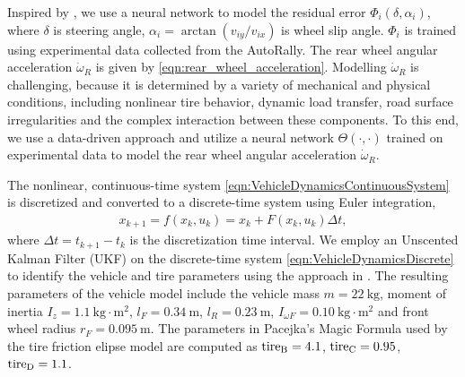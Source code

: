 Inspired by \cite{acosta2018tire}, we use a neural network to model the residual error $\Phi_i(\delta, \alpha_i)$, where $\delta$ is steering angle, $\alpha_i = \arctan(v_{iy}/v_{ix})$ is wheel slip angle. $\Phi_i$ is trained using experimental data collected from the AutoRally. The rear wheel angular acceleration $\dot{\omega}_R$ is given by \eqref{eqn:rear_wheel_acceleration}. Modelling $\dot{\omega}_R$ is challenging, because it is determined by a variety of mechanical and physical conditions, including nonlinear tire behavior, dynamic load transfer, road surface irregularities and the complex interaction between these components. To this end, we use a data-driven approach and utilize a neural network $\Theta(\cdot, \cdot)$ trained on experimental data to model the rear wheel angular acceleration $\dot{\omega}_R$.

The nonlinear, continuous-time system \eqref{eqn:VehicleDynamicsContinuousSystem} is discretized and converted to a discrete-time system using Euler integration,
\begin{align}\label{eqn:VehicleDynamicsDiscrete}
    x_{k+1} = f(x_k, u_k) = x_k + F(x_k, u_k)\Delta t,
\end{align}
where $\Delta t = t_{k+1} - t_k$ is the discretization time interval.
We employ an Unscented Kalman Filter (UKF) on the discrete-time system \eqref{eqn:VehicleDynamicsDiscrete} to identify the vehicle and tire parameters using the approach in \cite{changxi}. The resulting parameters of the vehicle model include the vehicle mass $m = 22~\mathrm{kg}$, moment of inertia $I_z = 1.1 ~\mathrm{kg\cdot m^2}$, $l_F = 0.34~\mathrm{m}$, $l_R = 0.23~\mathrm{m}$, $I_{\omega F} = 0.10 ~\mathrm{kg\cdot m^2}$ and front wheel radius $r_F = 0.095~\mathrm{m}$. The parameters in Pacejka's Magic Formula used by the tire friction elipse model \cite{velenis2010steady} are computed as $\mathrm{tire}_{\mathrm{B}} = 4.1$, $\mathrm{tire}_{\mathrm{C}}=0.95$, $\mathrm{tire}_{\mathrm{D}}=1.1$.